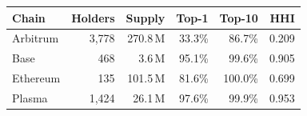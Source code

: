 \begin{tabular}{@{}lrrrrr@{}}
\toprule
Chain & Holders & Supply & Top-1 & Top-10 & HHI \\
\midrule
Arbitrum & 3,778 & 270.8\,M & 33.3\% & 86.7\% & 0.209 \\
Base & 468 & 3.6\,M & 95.1\% & 99.6\% & 0.905 \\
Ethereum & 135 & 101.5\,M & 81.6\% & 100.0\% & 0.699 \\
Plasma & 1,424 & 26.1\,M & 97.6\% & 99.9\% & 0.953 \\
\bottomrule
\end{tabular}
